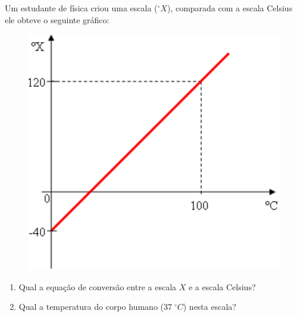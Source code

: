 %
%
    Um estudante de física criou uma escala ($^\circ X$), comparada com a escala Celsius ele obteve o seguinte gráfico:
    \begin{figure}[ht]
        \centering
        \includegraphics[scale=0.3]{graph1.pdf}
        \label{fig:graphterm1}
    \end{figure}
    \begin{enumerate}[label=\alph*),nosep]
        \item Qual a equação de conversão entre a escala $X$ e a escala Celsius?
        \item Qual a temperatura do corpo humano ($37\;^\circ C$) nesta escala?
    \end{enumerate}
